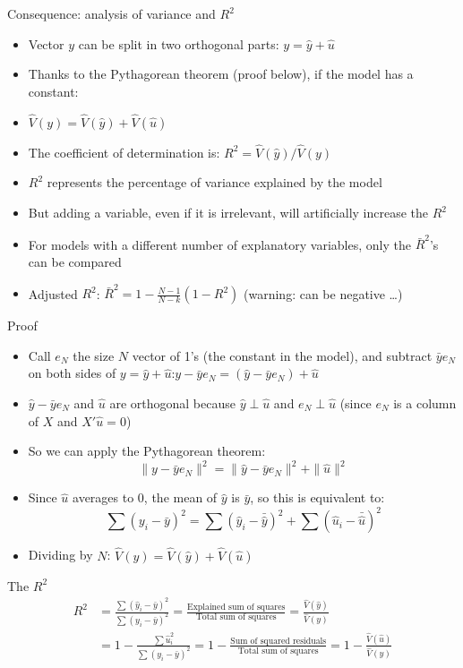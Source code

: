 \documentclass[aspectratio=169]{beamer}
\begin{document}
\begin{frame}{Consequence: analysis of variance and $R^2$}
\begin{itemize}
    \item Vector $y$ can be split in two orthogonal parts: $y = \hat{y} + \hat{u}$
    \item Thanks to the Pythagorean theorem (proof below), if the model has a constant:
    \item $\hat{V}(y) = \hat{V}(\hat{y}) + \hat{V}(\hat{u})$
    \item The coefficient of determination is: $R^2 = \hat{V}(\hat{y})/\hat{V}(y)$
    \item $R^2$ represents the percentage of variance explained by the model
    \item But adding a variable, even if it is irrelevant, will artificially increase the $R^2$
    \item For models with a different number of explanatory variables, only the $\bar{R}^2$'s can be compared
    \item Adjusted $R^2$: $\bar{R}^2 = 1 - \frac{N-1}{N-k}(1 - R^2)$ (warning: can be negative \dots)
\end{itemize}
\end{frame}

\begin{frame}{Proof}
\begin{itemize}
    \item Call $e_N$ the size $N$ vector of 1's (the constant in the model), and subtract $\bar{y}e_N$ on both sides of $y = \hat{y} + \hat{u}$:\quad $y - \bar{y}e_N = (\hat{y} - \bar{y}e_N) + \hat{u}$
    \item $\hat{y} - \bar{y}e_N$ and $\hat{u}$ are orthogonal because $\hat{y} \perp \hat{u}$ and $e_N \perp \hat{u}$ (since $e_N$ is a column of $X$ and $X'\hat{u} = 0$)
    \item So we can apply the Pythagorean theorem:
    \[\|y - \bar{y}e_N\|^2 = \|\hat{y} - \bar{y}e_N\|^2 + \|\hat{u}\|^2\]
    \item Since $\hat{u}$ averages to 0, the mean of $\hat{y}$ is $\bar{y}$, so this is equivalent to:
    \[\textstyle\sum(y_i - \bar{y})^2 = \sum(\hat{y}_i - \bar{\hat{y}})^2 + \sum(\hat{u}_i - \bar{\hat{u}})^2\]
    \item Dividing by $N$: $\hat{V}(y) = \hat{V}(\hat{y}) + \hat{V}(\hat{u})$
\end{itemize}
\end{frame}

\begin{frame}{The $R^2$}
\begin{align*}
R^2 &= \frac{\sum(\hat{y}_i - \bar{y})^2}{\sum(y_i - \bar{y})^2} = \frac{\text{Explained sum of squares}}{\text{Total sum of squares}} = \frac{\hat{V}(\hat{y})}{\hat{V}(y)}\\
&= 1 - \frac{\sum \hat{u}_i^2}{\sum(y_i - \bar{y})^2} = 1 - \frac{\text{Sum of squared residuals}}{\text{Total sum of squares}} = 1 - \frac{\hat{V}(\hat{u})}{\hat{V}(y)}
\end{align*}
\end{frame}
\end{document}
